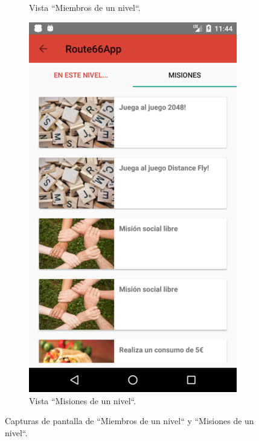 \documentclass[twoside]{report}
\begin{document}
\begin{figure}[H]
\begin{center}
\begin{subfigure}[t]{.3\linewidth}
		\caption{Vista “Miembros de un nivel“.}
	\end{subfigure}\hspace{5mm}%
	\begin{subfigure}[t]{.3\linewidth}
		\includegraphics[scale=0.2]{images/userguide/24.png}
		\caption{Vista “Misiones de un nivel“.}
	\end{subfigure}\hspace{5mm}%
\caption{Capturas de pantalla de “Miembros de un nivel“ y “Misiones de un nivel“.}
\end{center}
\end{figure}
\end{document}
